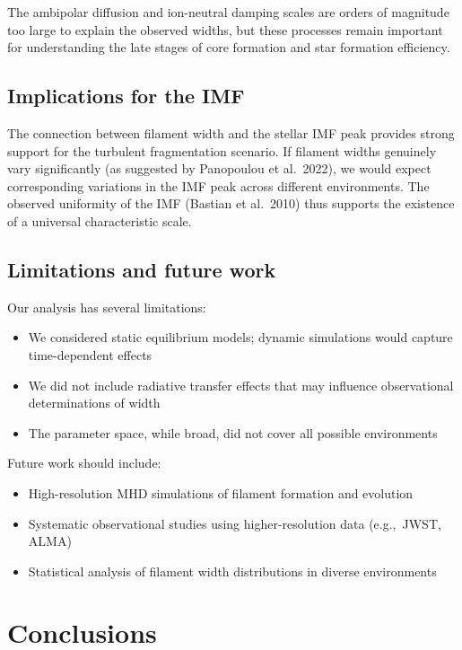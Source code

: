 \documentclass{mnras}
\begin{document}
The ambipolar diffusion and ion-neutral damping scales are orders of magnitude too large to explain the observed widths, but these processes remain important for understanding the late stages of core formation and star formation efficiency.

\subsection{Implications for the IMF}

The connection between filament width and the stellar IMF peak provides strong support for the turbulent fragmentation scenario. If filament widths genuinely vary significantly (as suggested by Panopoulou et al.~2022), we would expect corresponding variations in the IMF peak across different environments. The observed uniformity of the IMF (Bastian et al.~2010) thus supports the existence of a universal characteristic scale.

\subsection{Limitations and future work}

Our analysis has several limitations:
\begin{itemize}
\item We considered static equilibrium models; dynamic simulations would capture time-dependent effects
\item We did not include radiative transfer effects that may influence observational determinations of width
\item The parameter space, while broad, did not cover all possible environments
\end{itemize}

Future work should include:
\begin{itemize}
\item High-resolution MHD simulations of filament formation and evolution
\item Systematic observational studies using higher-resolution data (e.g.,~JWST, ALMA)
\item Statistical analysis of filament width distributions in diverse environments
\end{itemize}


\section{Conclusions}
\end{document}
